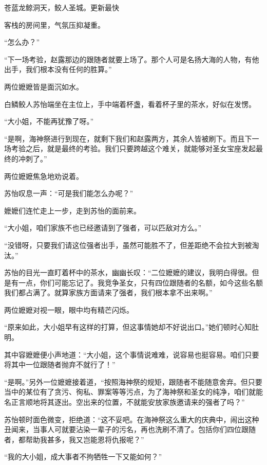 
\begin{this_body}

苍蓝龙鲸洞天，鲛人圣城。更新最快

客栈的房间里，气氛压抑凝重。

“怎么办？”

“下一场考验，赵露那边的跟随者就要上场了。那个人可是名扬大海的人物，有他出手，我们根本没有任何的胜算。”

两位嬷嬷皆是面沉如水。

白鳞鲛人苏怡端坐在主位上，手中端着杯盏，看着杯子里的茶水，好似在发愣。

“大小姐，不能再犹豫了呀。”

“是啊，海神祭进行到现在，就剩下我们和赵露两方，其余人皆被刷下。而且下一场考验之后，就是最终的考验。我们只要跨越这个难关，就能够对圣女宝座发起最终的冲刺了。”

两位嬷嬷焦急地劝说着。

苏怡叹息一声：“可是我们能怎么办呢？”

嬷嬷们连忙走上一步，走到苏怡的面前来。

“大小姐，咱们家族不也已经邀请到了强者，可以匹敌对方么。”

“没错呀，只要我们请这位强者出手，虽然可能胜不了，但差距绝不会拉大到被淘汰。”

苏怡的目光一直盯着杯中的茶水，幽幽长叹：“二位嬷嬷的建议，我明白得很。但是有一点，你们可能忘记了。我竞争圣女，只有四位跟随者的名额，如今这些名额我们都占满了。就算家族方面请来了强者，我们根本拿不出来啊。”

两位嬷嬷对视一眼，眼中均有精芒闪烁。

“原来如此，大小姐早有这样的打算，但这事情她却不好说出口。”她们顿时心知肚明。

其中容嬷嬷便小声地道：“大小姐，这个事情说难难，说容易也挺容易。咱们只要将其中一位跟随者抛弃不就行了！”

“是啊。”另外一位嬷嬷接着道，“按照海神祭的规矩，跟随者不能随意舍弃。但只要当中的某位有了贪污、徇私、罪案等等污点，为了海神祭和圣女的纯净，咱们就能名正言顺地将其逐出。空出来的位置，不就能安放家族邀请来的强者了吗？”

苏怡顿时面色微变，拒绝道：“这不妥吧。在海神祭这么重大的庆典中，闹出这种丑闻来，当事人可就要沾染一辈子的污名，再也洗刷不清了。包括你们四位跟随者，都帮助我甚多，我又岂能恩将仇报呢？”

“我的大小姐，成大事者不拘牺牲一下又能如何？”


\end{this_body}
